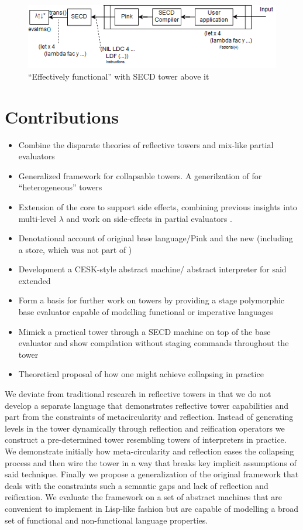 \documentclass{article}
\theoremstyle{definition}
\begin{document}
\begin{figure}[t]
	\centering
	\includegraphics[scale=0.75]{secd_arch.png}
	\caption{``Effectively functional'' \mslangStar with SECD tower above it}\label{secd_tower_arch}
\end{figure}

\section{Contributions}
\begin{itemize}
	\item Combine the disparate theories of reflective towers and mix-like partial evaluators
	\item Generalized framework for collapsable towers. A generilzation of \cite{amin2017collapsing} for ``heterogeneous'' towers
	\item Extension of the core \mslang to support side effects, combining previous insights into multi-level $\lambda$ \cite{nielson1996multi} and work on side-effects in partial evaluators \cite{asai1997partial}.
	\item Denotational account of original base language/Pink and the new \mslang (including a store, which was not part of \cite{danvy1988intensions})
	\item Development a CESK-style abstract machine/ abstract interpreter for said extended \mslang
	\item Form a basis for further work on towers by providing a stage polymorphic base evaluator capable of modelling functional or imperative languages
	\item Mimick a practical tower through a SECD machine on top of the base evaluator and show compilation without staging commands throughout the tower
	\item Theoretical proposal of how one might achieve collapsing in practice
\end{itemize}

We deviate from traditional research in reflective towers in that we do not develop a separate language that demonstrates reflective tower capabilities and part from the constraints of metacircularity and reflection.
Instead of generating levels in the tower dynamically through reflection and reification operators we construct a pre-determined tower resembling towers of interpreters in practice. We demonstrate initially how meta-circularity and reflection
eases the collapsing process and then wire the tower in a way that breaks key implicit assumptions of said technique. Finally we propose a generalization of the original framework that deals with the constraints such a semantic gaps and lack of
reflection and reification. We evaluate the framework on a set of abstract machines that are convenient to implement in Lisp-like fashion but are capable of modelling a broad set of functional and non-functional language properties.
\end{document}
